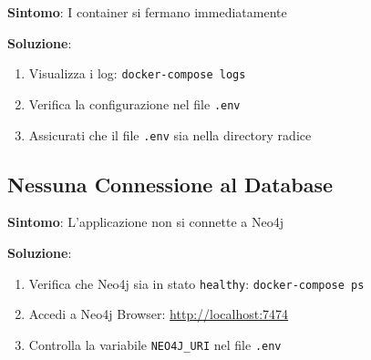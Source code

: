 \textbf{Sintomo}: I container si fermano immediatamente

\textbf{Soluzione}:
\begin{enumerate}
    \item Visualizza i log: \texttt{docker-compose logs}
    \item Verifica la configurazione nel file \texttt{.env}
    \item Assicurati che il file \texttt{.env} sia nella directory radice
\end{enumerate}

\subsection{Nessuna Connessione al Database}

\textbf{Sintomo}: L'applicazione non si connette a Neo4j

\textbf{Soluzione}:
\begin{enumerate}
    \item Verifica che Neo4j sia in stato \texttt{healthy}: \texttt{docker-compose ps}
    \item Accedi a Neo4j Browser: \href{http://localhost:7474}{http://localhost:7474}
    \item Controlla la variabile \texttt{NEO4J\_URI} nel file \texttt{.env}
\end{enumerate}
